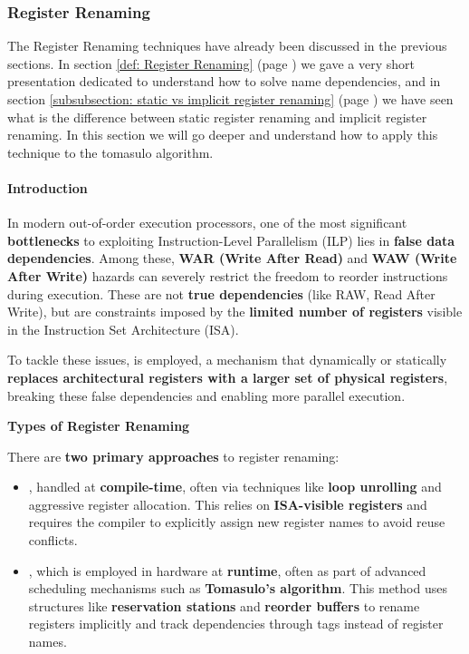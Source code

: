 \subsubsection{Register Renaming}\label{subsubsection: Register Renaming}

The Register Renaming techniques have already been discussed in the previous sections. In section \ref{def: Register Renaming} (page \pageref{def: Register Renaming}) we gave a very short presentation dedicated to understand how to solve name dependencies, and in section \ref{subsubsection: static vs implicit register renaming} (page \pageref{subsubsection: static vs implicit register renaming}) we have seen what is the difference between static register renaming and implicit register renaming. In this section we will go deeper and understand how to apply this technique to the tomasulo algorithm.

\paragraph{Introduction}

In modern out-of-order execution processors, one of the most significant \textbf{bottlenecks} to exploiting Instruction-Level Parallelism (ILP) lies in \textbf{false data dependencies}. Among these, \textbf{WAR (Write After Read)} and \textbf{WAW (Write After Write)} hazards can severely restrict the freedom to reorder instructions during execution. These are not \textbf{true dependencies} (like RAW, Read After Write), but are constraints imposed by the \textbf{limited number of registers} visible in the Instruction Set Architecture (ISA).

\highspace
To tackle these issues,  is employed, a mechanism that dynamically or statically \textbf{replaces architectural registers with a larger set of physical registers}, breaking these false dependencies and enabling more parallel execution.

\highspace
\begin{flushleft}
    \textcolor{Green3}{ \textbf{Types of Register Renaming}}
\end{flushleft}
There are \textbf{two primary approaches} to register renaming:
\begin{itemize}
    \item {}, handled at \textbf{compile-time}, often via techniques like \textbf{loop unrolling} and aggressive register allocation. This relies on \textbf{ISA-visible registers} and requires the compiler to explicitly assign new register names to avoid reuse conflicts.

    \item {}, which is employed in hardware at \textbf{runtime}, often as part of advanced scheduling mechanisms such as \textbf{Tomasulo's algorithm}. This method uses structures like \textbf{reservation stations} and \textbf{reorder buffers} to rename registers implicitly and track dependencies through tags instead of register names.
\end{itemize}

